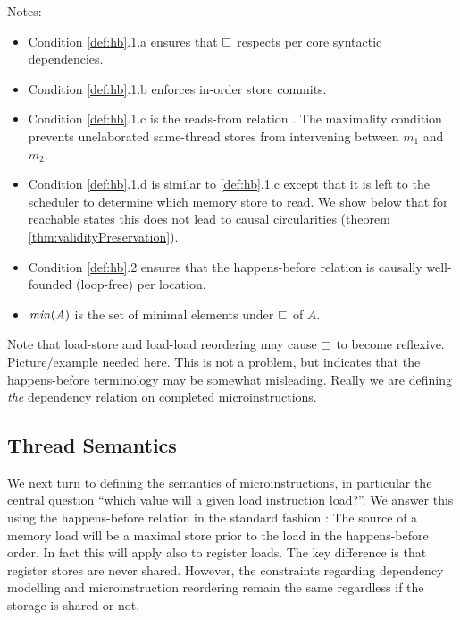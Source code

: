 Notes:
\begin{itemize}
\item Condition \ref{def:hb}.1.a ensures that $\sqsubset$ respects per core syntactic dependencies.
\item Condition \ref{def:hb}.1.b enforces in-order store commits.
\item Condition \ref{def:hb}.1.c is the reads-from relation \cite{readsfrom}.
The maximality condition prevents unelaborated same-thread stores from intervening between $m_1$ and $m_2$.
\item Condition \ref{def:hb}.1.d is similar to \ref{def:hb}.1.c except that
it is left to the scheduler to determine which memory store to read. We show below that for reachable states this does not lead to causal circularities (theorem \ref{thm:validityPreservation}).
\item Condition \ref{def:hb}.2 ensures that the happens-before relation is causally well-founded (loop-free) per location. 
\item $\mathit{min}(A)$ is the set of minimal elements under $\sqsubset$ of $A$.
\end{itemize}
%
Note that load-store and load-load reordering may cause $\sqsubset$ to become reflexive. Picture/example needed here. This
is not a problem, but indicates that the happens-before terminology may be somewhat misleading. Really we are defining \emph{the} dependency relation on completed microinstructions. 

\subsection{Thread Semantics}
\label{sec:ooo:semantics}
%
We next turn to defining the semantics of microinstructions, in particular the central question ``which value will a given load instruction load?''.
We answer this using the happens-before relation in the standard fashion \cite{Lamport-happens-before}: The source of a memory load will be a maximal store prior to the load in the happens-before order. In fact this will apply also to register loads. The key difference is that register stores are never shared. However, the constraints regarding dependency modelling and microinstruction reordering remain the same regardless if the storage is shared or not.


